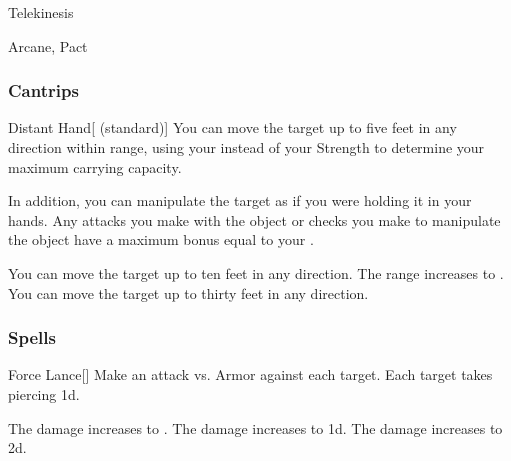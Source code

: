 \newpage
\begin{spellsection}{Telekinesis}

\begin{spellheader}
\end{spellheader}


 Arcane, Pact

\subsubsection{Cantrips}


\begin{freeability}{Distant Hand}[ (standard)]
You can move the target up to five feet in any direction within range, using your  instead of your Strength to determine your maximum carrying capacity.

In addition, you can manipulate the target as if you were holding it in your hands.
Any attacks you make with the object or checks you make to manipulate the object have a maximum bonus equal to your .

\rankline
{} You can move the target up to ten feet in any direction.
 The range increases to \rngmed.
 You can move the target up to thirty feet in any direction.
\end{freeability}

\end{spellsection}


\subsubsection{Spells}


\lowercase{\hypertarget{spell:Force Lance}{}}\label{spell:Force Lance}
\begin{freeability}[Rank 1]{\hypertarget{spell:Force Lance}{Force Lance}}[]
Make an attack vs. Armor against each target.
\hit Each target takes piercing  \minus1d.

\rankline
{} The damage increases to .
 The damage increases to  \plus1d.
 The damage increases to  \plus2d.
\end{freeability}
\vspace{0.25em}



